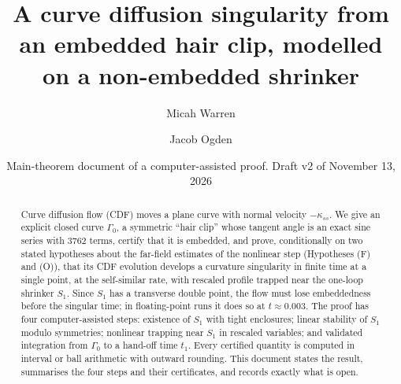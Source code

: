\documentclass[11pt]{amsart}
\title[CDF singularity from an embedded hair clip]{A curve diffusion singularity from an embedded hair clip, modelled on a non-embedded shrinker}
\author{Micah Warren}
\author{Jacob Ogden}
\date{Main-theorem document of a computer-assisted proof. Draft v2 of November 13, 2026}
\theoremstyle{definition}
\theoremstyle{remark}
\begin{document}
\begin{abstract}
Curve diffusion flow (CDF) moves a plane curve with normal velocity $-\kappa_{ss}$. We give an explicit closed curve $\Gamma_0$, a symmetric ``hair clip'' whose tangent angle is an exact sine series with $3762$ terms, certify that it is embedded, and prove, conditionally on two stated hypotheses about the far-field estimates of the nonlinear step (Hypotheses (F) and (O)), that its CDF evolution develops a curvature singularity in finite time at a single point, at the self-similar rate, with rescaled profile trapped near the one-loop shrinker $S_1$. Since $S_1$ has a transverse double point, the flow must lose embeddedness before the singular time; in floating-point runs it does so at $t\approx0.003$. The proof has four computer-assisted steps: existence of $S_1$ with tight enclosures; linear stability of $S_1$ modulo symmetries; nonlinear trapping near $S_1$ in rescaled variables; and validated integration from $\Gamma_0$ to a hand-off time $t_1$. Every certified quantity is computed in interval or ball arithmetic with outward rounding. This document states the result, summarises the four steps and their certificates, and records exactly what is open.
\end{abstract}
\maketitle

\begin{center}\end{center}
\end{document}

